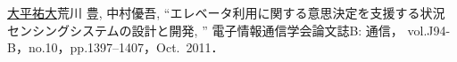 \publications


\def\mej{\underline{大平祐大}}
\def\me{\underline{Y.~Ohira}}

\begin{publication}{99}
  \mej 荒川 豊, 中村優吾,
  ``エレベータ利用に関する意思決定を支援する状況センシングシステムの設計と開発, \<''
  電子情報通信学会論文誌B: 通信，
  vol.J94-B，no.10，pp.1397--1407，Oct.\ 2011．
\end{publication}





